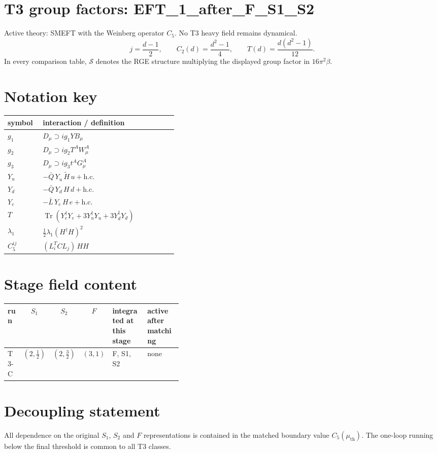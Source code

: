 \documentclass[9pt]{article}
\begin{document}
\section*{T3 group factors: EFT\_1\_after\_F\_S1\_S2}
Active theory: SMEFT with the Weinberg operator $C_5$.  No T3 heavy field remains dynamical.
\[j=\frac{d-1}{2},\qquad C_2(d)=\frac{d^2-1}{4},\qquad T(d)=\frac{d(d^2-1)}{12}.\]
In every comparison table, $\mathcal{S}$ denotes the RGE structure multiplying the displayed group factor in $16\pi^2\beta$.
\section*{Notation key}
\begin{longtable}{@{}p{0.19\linewidth}p{0.73\linewidth}@{}}
\toprule
symbol & interaction / definition \\
\midrule
$g_1$ & $D_\mu\supset i g_1 Y B_\mu$ \\
$g_2$ & $D_\mu\supset i g_2 T^A W_\mu^A$ \\
$g_3$ & $D_\mu\supset i g_3 t^A G_\mu^A$ \\
$Y_u$ & $-\bar Q\,Y_u\,\widetilde H\,u+\mathrm{h.c.}$ \\
$Y_d$ & $-\bar Q\,Y_d\,H\,d+\mathrm{h.c.}$ \\
$Y_e$ & $-\bar L\,Y_e\,H\,e+\mathrm{h.c.}$ \\
$T$ & $\operatorname{Tr}\!\left(Y_e^\dagger Y_e+3Y_u^\dagger Y_u+3Y_d^\dagger Y_d\right)$ \\
$\lambda_1$ & $\frac12\lambda_1(H^\dagger H)^2$ \\
$C_5^{ij}$ & $(L_i^T C L_j)\,H H$ \\
\bottomrule
\end{longtable}
\section*{Stage field content}
\begin{longtable}{@{}lccc p{0.20\linewidth}p{0.20\linewidth}@{}}
\toprule
run & $S_1$ & $S_2$ & $F$ & integrated at this stage & active after matching \\
\midrule
T3-C & $(2,\frac{1}{2})$ & $(2,\frac{3}{2})$ & $(3,1)$ & F, S1, S2 & none \\
\bottomrule
\end{longtable}
\section*{Decoupling statement}
All dependence on the original $S_1$, $S_2$ and $F$ representations is contained in the matched boundary value $C_5(\mu_{\mathrm{th}})$.  The one-loop running below the final threshold is common to all T3 classes.
\end{document}
